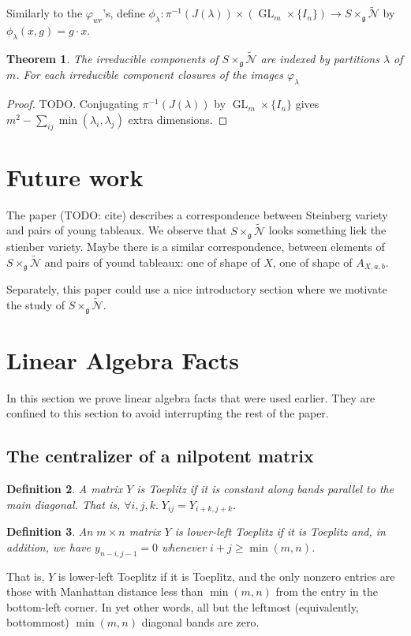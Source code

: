\documentclass[12pt,psamsfonts]{article}
\DeclareMathOperator{\GL}{GL}
\newtheorem{theorem}{Theorem}[section]
\newtheorem{definition}[theorem]{Definition}
\begin{document}
Similarly to the \(\varphi_{wr}\)'s, define \(\phi_\lambda : \pi^{-1}(J(\lambda)) \times (\GL_m \times \{I_n\}) \to S \times_\mathfrak{g} \widetilde{\mathcal{N}}\) by \(\phi_\lambda(x, g) = g \cdot x\).
\begin{theorem}
    The irreducible components of \(S \times_\mathfrak{g} \widetilde{\mathcal{N}}\) are indexed by partitions \(\lambda\) of \(m\).
    For each irreducible component
    closures of the images \(\varphi_\lambda\)
\end{theorem}
\begin{proof}
    TODO.
    Conjugating \(\pi^{-1}(J(\lambda))\) by \(\GL_m \times \{I_n\}\) gives \(m^2 - \sum_{ij} \min(\lambda_i,\lambda_j)\) extra dimensions.
\end{proof}

\section{Future work}
The paper (TODO: cite) describes a correspondence between Steinberg variety and pairs of young tableaux.  
We observe that \(S \times_\mathfrak{g} \widetilde{\mathcal{N}}\) looks something liek the stienber variety.
Maybe there is a similar correspondence, between elements of \(S \times_\mathfrak{g} \widetilde{\mathcal{N}}\) and pairs of yound tableaux: one of shape of \(X\), one of shape of \(A_{X, a, b}\).
\par Separately, this paper could use a nice introductory section where we motivate the study of \(S \times_\mathfrak{g} \widetilde{\mathcal{N}}\).

\section{Linear Algebra Facts}
In this section we prove linear algebra facts that were used earlier.
They are confined to this section to avoid interrupting the rest of the paper.

\subsection{The centralizer of a nilpotent matrix}
\begin{definition}
    A matrix \(Y\) is \emph{Toeplitz} if it is constant along bands parallel to the main diagonal.
    That is, \(\forall i,j,k. \; Y_{ij} = Y_{i + k, j + k}\).
\end{definition}
\begin{definition}
    An \(m \times n\) matrix \(Y\) is \emph{lower-left Toeplitz} if it is Toeplitz and, in addition, we have \(y_{n - i, j - 1} = 0\) whenever \(i + j \geq \min(m,n)\).
\end{definition}
That is, \(Y\) is lower-left Toeplitz if it is Toeplitz, and the only nonzero entries are those with Manhattan distance less than \(\min(m,n)\) from the entry in the bottom-left corner.
In yet other words, all but the leftmost (equivalently, bottommost) \(\min(m,n)\) diagonal bands are zero.
\end{document}

